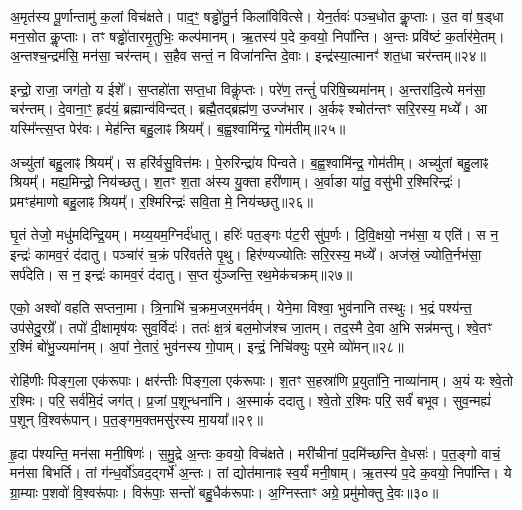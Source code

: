 अ॒मृत॑स्य पू॒र्णान्तामु॑ क॒लां  विच॑क्षते। 
पाद॒ꣳ॒ षड्ढो॑तु॒र्न किला॑विवित्से। 
येन॒र्तवः॑ पञ्च॒धोत कॢ॒प्ताः। 
उ॒त वा॑ ष॒ड्धा मन॒सोत कॢ॒प्ताः। 
तꣳ षड्ढो॑तारमृ॒तुभिः॒ कल्प॑मानम्। 
ऋ॒तस्य॑ प॒दे क॒वयो॒ निपा᳚न्ति। 
अ॒न्तः प्रवि॑ष्टं क॒र्तार॑मे॒तम्। 
अ॒न्तश्च॒न्द्रम॑सि॒ मन॑सा॒ चर॑न्तम्। 
स॒हैव सन्तं॒ न विजा॑नन्ति दे॒वाः। 
इन्द्र॑स्या॒त्मानꣳ॑ शत॒धा चर॑न्तम्॥२४॥%

इन्द्रो॒ राजा॒ जग॑तो॒ य ईशे᳚। 
स॒प्तहो॑ता सप्त॒धा विकॢ॑प्तः। 
परे॑ण॒ तन्तुं॑ परिषि॒च्यमा॑नम्। 
अ॒न्तरा॑दि॒त्ये मन॑सा॒ चर॑न्तम्। 
दे॒वाना॒ꣳ॒ हृद॑यं॒ ब्रह्मान्व॑विन्दत्। 
ब्रह्मै॒तद्ब्रह्म॑ण॒ उज्ज॑भार। 
अ॒र्कꣴ श्चोत॑न्तꣳ सरि॒रस्य॒ मध्ये᳚। 
आ यस्मि᳚न्त्स॒प्त पेर॑वः। 
मेह॑न्ति बहु॒लाꣴ श्रियम्᳚। 
ब॒ह्व॒श्वामि॑न्द्र॒ गोम॑तीम्॥२५॥%

अच्यु॑तां बहु॒लाꣴ श्रियम्᳚। 
स हरि॑र्वसु॒वित्त॑मः। 
पे॒रुरिन्द्रा॑य पिन्वते। 
ब॒ह्व॒श्वामि॑न्द्र॒ गोम॑तीम्। 
अच्यु॑तां बहु॒लाꣴ श्रियम्᳚। 
मह्य॒मिन्द्रो॒ निय॑च्छतु। 
श॒तꣳ श॒ता अ॑स्य यु॒क्ता हरी॑णाम्। 
अ॒र्वाङा या॑तु॒ वसु॑भी र॒श्मिरिन्द्रः॑। 
प्रमꣳह॑माणो बहु॒लाꣴ श्रियम्᳚। 
र॒श्मिरिन्द्रः॑ सवि॒ता मे॒ निय॑च्छतु॥२६॥%

घृ॒तं तेजो॒ मधु॑मदिन्द्रि॒यम्। 
मय्य॒यम॒ग्निर्द॑धातु। 
हरिः॑ पत॒ङ्गः प॑ट॒री सु॑प॒र्णः। 
दि॒वि॒क्षयो॒ नभ॑सा॒ य एति॑। 
स न॒ इन्द्रः॑ कामव॒रं द॑दातु। 
पञ्चा॑रं च॒क्रं परि॑वर्तते पृ॒थु। 
हिर॑ण्यज्योतिः सरि॒रस्य॒ मध्ये᳚। 
अज॑स्रं॒ ज्योति॒र्नभ॑सा॒ सर्प॑देति। 
स न॒ इन्द्रः॑ कामव॒रं द॑दातु। 
स॒प्त यु॑ञ्जन्ति॒ रथ॒मेक॑चक्रम्॥२७॥%

एको॒ अश्वो॑ वहति सप्तना॒मा। 
त्रि॒नाभि॑ च॒क्रम॒जर॒मन॑र्वम्। 
येने॒मा विश्वा॒ भुव॑नानि तस्थुः। 
भ॒द्रं पश्य॑न्त॒ उप॑सेदु॒रग्रे᳚। 
तपो॑ दी॒क्षामृष॑यः सुव॒र्विदः॑। 
ततः॑ क्ष॒त्रं बल॒मोज॑श्च जा॒तम्। 
तद॒स्मै दे॒वा अ॒भि सन्न॑मन्तु। 
श्वे॒तꣳ र॒श्मिं बो॑भु॒ज्यमा॑नम्। 
अ॒पां ने॒तारं॒ भुव॑नस्य गो॒पाम्। 
इन्द्रं॒ निचि॑क्युः पर॒मे व्यो॑मन्॥२८॥

रोहि॑णीः पिङ्ग॒ला एक॑रूपाः। 
क्षर॑न्तीः पिङ्ग॒ला एक॑रूपाः। 
श॒तꣳ स॒हस्रा॑णि प्र॒युता॑नि॒ नाव्या॑नाम्। 
अ॒यं यः श्वे॒तो र॒श्मिः। 
परि॒ सर्व॑मि॒दं जग॑त्। 
प्र॒जां प॒शून्धना॑नि। 
अ॒स्माकं॑ ददातु। 
श्वे॒तो र॒श्मिः परि॒ सर्वं॑ बभूव। 
सुव॒न्मह्यं॑ प॒शून् वि॒श्वरू॑पान्। 
प॒त॒ङ्गम॒क्तमसु॑रस्य मा॒यया᳚॥२९॥%

हृ॒दा प॑श्यन्ति॒ मन॑सा मनी॒षिणः॑। 
स॒मु॒द्रे अ॒न्तः क॒वयो॒ विच॑क्षते। 
मरी॑चीनां प॒दमि॑च्छन्ति वे॒धसः॑। 
प॒त॒ङ्गो वाचं॒ मन॑सा बिभर्ति। 
तां ग॑न्ध॒र्वो॑ऽवद॒द्गर्भे॑ अ॒न्तः। 
तां द्योत॑मानाꣴ स्व॒र्यं॑ मनी॒षाम्। 
ऋ॒तस्य॑ प॒दे क॒वयो॒ निपा᳚न्ति। 
ये ग्रा॒म्याः प॒शवो॑ वि॒श्वरू॑पाः। 
विरू॑पाः॒ सन्तो॑ बहु॒धैक॑रूपाः। 
अ॒ग्निस्ताꣳ अग्रे॒ प्रमु॑मोक्तु दे॒वः॥३०॥

